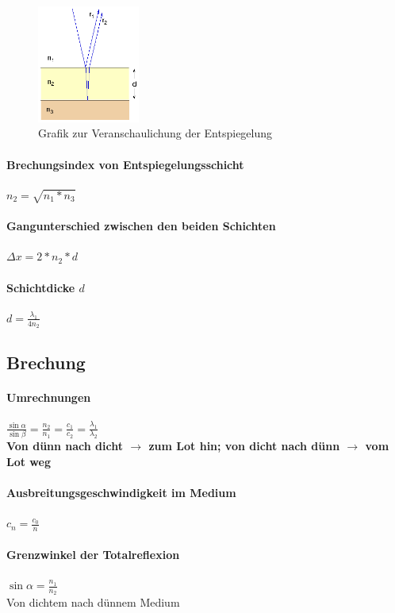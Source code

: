\documentclass[12pt, a4paper]{scrreprt}
\begin{document}
\begin{figure}[H]
  \centering
  \includegraphics[width = 0.3\textwidth]{./Grafiken/Entspiegelung.png}
  \caption[Entspiegelung]{Grafik zur Veranschaulichung der Entspiegelung}
  \label{fig:Entspiegelung}
\end{figure}

\paragraph{Brechungsindex von Entspiegelungsschicht} \dotfill \(n_2 = \sqrt{n_1 * n_3}\)
\paragraph{Gangunterschied zwischen den beiden Schichten} \dotfill \(\Delta x = 2 * n_2 * d\)
\paragraph{Schichtdicke \(d\)} \dotfill \(d = \frac{\lambda_1}{4n_2}\)


\subsection{Brechung}

\paragraph{Umrechnungen} \dotfill \(\frac{\sin \alpha}{\sin \beta} = \frac{n_2}{n_1} = \frac{c_1}{c_2} = \frac{\lambda_1}{\lambda_2}\)\\[1em]
\myhspace{} \textbf{Von dünn nach dicht $\rightarrow$ zum Lot hin; von dicht nach dünn $\rightarrow$ vom Lot weg}
\paragraph{Ausbreitungsgeschwindigkeit im Medium} \dotfill \(c_n = \frac{c_0}{n}\)
\paragraph{Grenzwinkel der Totalreflexion} \dotfill \(\sin \alpha = \frac{n_1}{n_2}\)\\
\myhspace{} Von dichtem nach dünnem Medium
\end{document}
